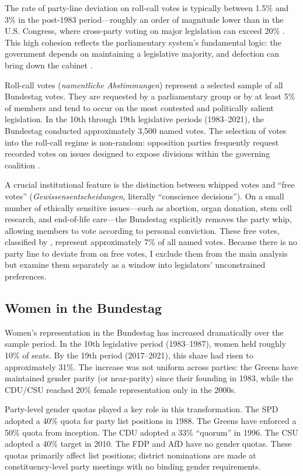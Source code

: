 \documentclass[12pt]{article}
\begin{document}
The rate of party-line deviation on roll-call votes is typically between 1.5\% and 3\% in the post-1983 period---roughly an order of magnitude lower than in the U.S. Congress, where cross-party voting on major legislation can exceed 20\% \citep{theriault2003}. This high cohesion reflects the parliamentary system's fundamental logic: the government depends on maintaining a legislative majority, and defection can bring down the cabinet \citep{thies2001}.

Roll-call votes (\textit{namentliche Abstimmungen}) represent a selected sample of all Bundestag votes. They are requested by a parliamentary group or by at least 5\% of members and tend to occur on the most contested and politically salient legislation. In the 10th through 19th legislative periods (1983--2021), the Bundestag conducted approximately 3,500 named votes. The selection of votes into the roll-call regime is non-random: opposition parties frequently request recorded votes on issues designed to expose divisions within the governing coalition \citep{hohendorf2022}.

A crucial institutional feature is the distinction between whipped votes and ``free votes'' (\textit{Gewissensentscheidungen}, literally ``conscience decisions''). On a small number of ethically sensitive issues---such as abortion, organ donation, stem cell research, and end-of-life care---the Bundestag explicitly removes the party whip, allowing members to vote according to personal conviction. These free votes, classified by \citet{hohendorf2022}, represent approximately 7\% of all named votes. Because there is no party line to deviate from on free votes, I exclude them from the main analysis but examine them separately as a window into legislators' unconstrained preferences.

\subsection{Women in the Bundestag}

Women's representation in the Bundestag has increased dramatically over the sample period. In the 10th legislative period (1983--1987), women held roughly 10\% of seats. By the 19th period (2017--2021), this share had risen to approximately 31\%. The increase was not uniform across parties: the Greens have maintained gender parity (or near-parity) since their founding in 1983, while the CDU/CSU reached 20\% female representation only in the 2000s.

Party-level gender quotas played a key role in this transformation. The SPD adopted a 40\% quota for party list positions in 1988. The Greens have enforced a 50\% quota from inception. The CDU adopted a 33\% ``quorum'' in 1996. The CSU adopted a 40\% target in 2010. The FDP and AfD have no gender quotas. These quotas primarily affect list positions; district nominations are made at constituency-level party meetings with no binding gender requirements.
\end{document}
